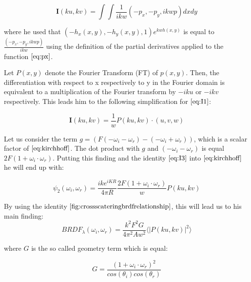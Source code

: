 \begin{equation}
    \mathbf{I}(ku, kv) = \int \int \frac{1}{ikw}(-p_x, -p_y, ikwp) dx dy
\label{eq:I2}
\end{equation}

where he used that $(-h_{x}(x,y), -h_{y}(x,y), 1)e^{kwh(x,y)}$ is equal to $\frac{(-p_x, -p_y, ikwp)}{ikw}$ using the definition of the partial derivatives applied to the function $\ref{eq:px}$.

Let $P(x,y)$ denote the Fourier Transform (FT) of $p(x,y)$. Then, the differentiation with respect to x respectively to y in the Fourier domain is equivalent to a multiplication of the Fourier transform by $-iku$ or $-ikv$ respectively. This leads him to the following simplification for $\ref{eq:I1}$:

\begin{equation}
    \mathbf{I}(ku, kv) = \frac{1}{w}P(ku, kv) \cdot (u,v,w)
\label{eq:I3}
\end{equation}

Let us consider the term $g = (F(-\omega_i - \omega_r)-(-\omega_i + \omega_r))$, which is a scalar factor of $\ref{eq:kirchhoff}$. The dot product with $g$ and $(-\omega_i - \omega_r)$ is equal $2F(1 + \omega_i \cdot \omega_r)$. Putting this finding and the identity $\ref{eq:I3}$ into $\ref{eq:kirchhoff}$ he will end up with:

\begin{equation}
\psi_{2}(\omega_i, \omega_r) = \frac{i k e^{i K R}}{4 \pi R} \frac{2F(1 + \omega_i \cdot \omega_r)}{w} P(ku, kv)
\label{eq:kirchhoffFinding}
\end{equation}

By using the identity $\ref{fig:crossscateringbrdfrelationship}$, this will lead us to his main finding:
\begin{equation} 
  BRDF_{\lambda}(\omega_i, \omega_r) = \frac{k^2 F^2 G}{4\pi^2 A w^2} \langle \left|P(ku, kv)\right|^2\rangle
\label{eq:mainstam}
\end{equation}

where $G$ is the so called geometry term which is equal: 

\begin{equation}
  G =\frac{(1 + \omega_i \cdot \omega_r)^2}{cos(\theta_i)cos(\theta_r)}
\label{eq:geometricterm}
\end{equation}

